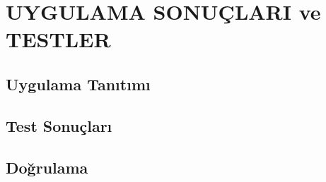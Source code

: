 \chapter{UYGULAMA SONUÇLARI ve TESTLER}

\section{Uygulama Tanıtımı}
\section{Test Sonuçları}
\section{Doğrulama}


